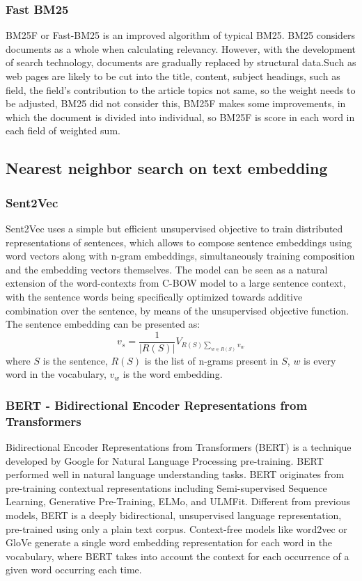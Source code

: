 \documentclass[10pt,a4paper,fleqn]{report}
\begin{document}
			\subsubsection{Fast BM25}
			
				BM25F or Fast-BM25 is an improved algorithm of typical BM25. BM25 considers documents as a whole when calculating relevancy. However, with the development of search technology, documents are gradually replaced by structural data.Such as web pages are likely to be cut into the title, content, subject headings, such as field, the field's contribution to the article topics not same, so the weight needs to be adjusted, BM25 did not consider this, BM25F makes some improvements, in which the document is divided into individual, so BM25F is score in each word in each field of weighted sum.
				
		\subsection{Nearest neighbor search on text embedding}
		
			\subsubsection{Sent2Vec}
			
				Sent2Vec uses a simple but efficient unsupervised objective to train distributed representations of sentences, which allows to compose sentence embeddings using word vectors along with n-gram embeddings, simultaneously training composition and the embedding vectors themselves.
				The model can be seen as a natural extension of the word-contexts from C-BOW model to a large sentence context, with the sentence words being specifically optimized towards additive combination over the sentence, by means of the unsupervised objective function.
				The sentence embedding can be presented as:
				$$ v_s = \frac{1}{|R(S)|} V_{R(S)\sum_{w\in R(S)}v_w} $$
				where $S$ is the sentence, $R(S)$ is the list of n-grams present in $S$, $w$ is every word in the vocabulary, $v_w$ is the word embedding.
				
			
			\subsubsection{BERT - Bidirectional Encoder Representations from Transformers}
			
				Bidirectional Encoder Representations from Transformers (BERT) is a technique developed by Google for Natural Language Processing pre-training. BERT performed well in natural language understanding tasks. BERT originates from pre-training contextual representations including Semi-supervised Sequence Learning, Generative Pre-Training, ELMo, and ULMFit. Different from previous models, BERT is a deeply bidirectional, unsupervised language representation, pre-trained using only a plain text corpus. Context-free models like word2vec or GloVe generate a single word embedding representation for each word in the vocabulary, where BERT takes into account the context for each occurrence of a given word occurring each time.
				
\end{document}
